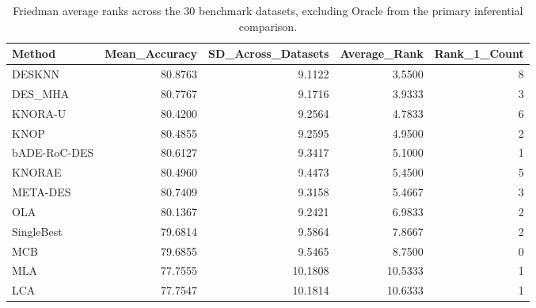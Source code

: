 \begin{table}
\caption{Friedman average ranks across the 30 benchmark datasets, excluding Oracle from the primary inferential comparison.}
\label{tab:primary-friedman}
\begin{tabular}{lrrrr}
\toprule
Method & Mean\_Accuracy & SD\_Across\_Datasets & Average\_Rank & Rank\_1\_Count \\
\midrule
DESKNN & 80.8763 & 9.1122 & 3.5500 & 8 \\
DES\_MHA & 80.7767 & 9.1716 & 3.9333 & 3 \\
KNORA-U & 80.4200 & 9.2564 & 4.7833 & 6 \\
KNOP & 80.4855 & 9.2595 & 4.9500 & 2 \\
bADE-RoC-DES & 80.6127 & 9.3417 & 5.1000 & 1 \\
KNORAE & 80.4960 & 9.4473 & 5.4500 & 5 \\
META-DES & 80.7409 & 9.3158 & 5.4667 & 3 \\
OLA & 80.1367 & 9.2421 & 6.9833 & 2 \\
SingleBest & 79.6814 & 9.5864 & 7.8667 & 2 \\
MCB & 79.6855 & 9.5465 & 8.7500 & 0 \\
MLA & 77.7555 & 10.1808 & 10.5333 & 1 \\
LCA & 77.7547 & 10.1814 & 10.6333 & 1 \\
\bottomrule
\end{tabular}
\end{table}
